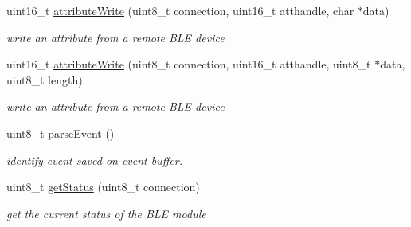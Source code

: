 \begin{DoxyCompactItemize}
uint16\+\_\+t \hyperlink{class_wasp_b_l_e_a57a393dbbce27c59f5bcef98f68a8cfb}{attribute\+Write} (uint8\+\_\+t connection, uint16\+\_\+t atthandle, char $\ast$data)
\begin{DoxyCompactList}\small\item\em write an attribute from a remote B\+LE device \end{DoxyCompactList}\item 
uint16\+\_\+t \hyperlink{class_wasp_b_l_e_ae42f115989386357c425863bf3d9a591}{attribute\+Write} (uint8\+\_\+t connection, uint16\+\_\+t atthandle, uint8\+\_\+t $\ast$data, uint8\+\_\+t length)
\begin{DoxyCompactList}\small\item\em write an attribute from a remote B\+LE device \end{DoxyCompactList}\item 
uint8\+\_\+t \hyperlink{class_wasp_b_l_e_a4081b1585f40f006fa640ff2148b7323}{parse\+Event} ()
\begin{DoxyCompactList}\small\item\em identify event saved on event buffer. \end{DoxyCompactList}\item 
uint8\+\_\+t \hyperlink{class_wasp_b_l_e_a891448a14f970ae397e2390f9be72566}{get\+Status} (uint8\+\_\+t connection)
\begin{DoxyCompactList}\small\item\em get the current status of the B\+LE module \end{DoxyCompactList}\end{DoxyCompactItemize}
